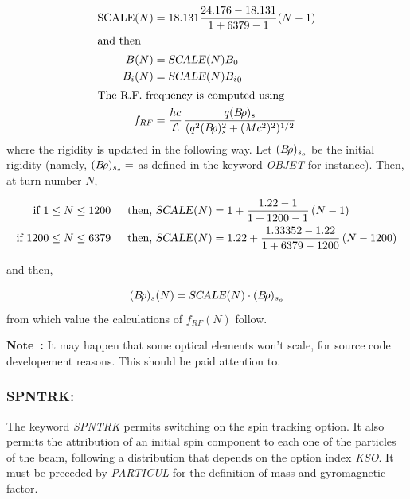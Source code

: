 \begin{align*}
   \text{SCALE}(N) & = 18.131 \dfrac{24.176-18.131 }{ 1+6379-1} (N-1)  \\
\intertext{and then}
     B(N)   &  = \text{\textsl{SCALE}}(N)B_0 \\ 
     B_i(N) &  = \text{\textsl{SCALE}}(N){B_i}_0 \\
\intertext{The  R.F. frequency is computed using}
     f_{RF} & = \dfrac{hc }{\mathcal{L}} \, 
              \dfrac{q(B\!\rho )_s }{ (q^2(B\!\rho )^2_s + (Mc^2)^2)^{1/2}} 
\end{align*}
%
where the rigidity is updated in the following way. Let $ (B\!\rho)_{s_o} $ be the 
initial rigidity (namely, $ (B\!\rho )_{s_o}= $ \BORO as defined in the keyword
\textsl{OBJET} for instance). Then, at turn number $ N$,   

\begin{alignat*}{2}
	\text{if  }   1 & \leq N\leq 1200 \,          
	            & \text{  then,  \textsl{SCALE}}(N)  & =1+ \dfrac{1.22-1 }{ 1+1200-1}\, (N-1) \\
	\text{if  }   1200 & \leq N\leq 6379 \,           
	            & \text{  then,  \textsl{SCALE}}(N)  & =1.22+ \dfrac{1.33352-1.22 }{ 1+6379-1200}\,(N-1200)    
\end{alignat*}
 
 \noindent and then,

$$ (B\!\rho )_s(N) = \text{\textsl{SCALE}}(N)\cdot (B\!\rho )_{s_o} $$
%
from which value the calculations of $ f_{RF}(N) $ follow. 


\bigskip

{\bf Note~:} It may happen that some optical elements won't scale, for source code developement reasons. 
This should be paid attention to. 

\newpage

\subsubsection*{SPNTRK: \SPNTRKTitl} \label{SPNTRK} 
\medskip

The keyword \textsl{SPNTRK} permits switching on the spin tracking 
option. It also permits the attribution of an initial spin component to each one of the 
\IMAX{} particles of the beam, following a distribution that depends 
on the option index \textsl{KSO}. It must be preceded by \textsl{PARTICUL} for
the definition of  mass and gyromagnetic factor.  
\medskip

